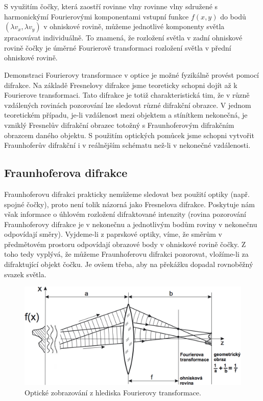 \documentclass[11pt,a4paper]{article}
\begin{document}
S využitím čočky, která zaostří rovinne vlny rovinne vlny sdružené s harmonickýmí Fourierovými komponentami
vstupní funkce $f(x,y)$ do bodů $(\lambda v_x, \lambda v_y)$ v ohniskové rovině, můžeme jednotlivé
komponenty světla zpracovávat individuálně. To znamená, že rozložení světla v zadní ohniskové 
rovině čočky je úměrné Fourierově transformaci rozložení světla v přední ohniskové rovině.

Demonstraci Fourierovy transformace v optice je možné fyzikálně provést pomocí difrakce. Na základě
Fresnelovy difrakce jsme teoreticky schopni dojít až k Fourierove transformaci. Tato difrakce je totiž
charakteristická tim, že v různě vzdálených rovinách pozorování lze sledovat různé difrakční obrazce. V jednom
teoretickém případu, je-li vzdálenost mezi objektem a stínítkem nekonečná, je vzniklý Fresnelův difrakční 
obrazec totožný s Fraunhoferovým difrakčním obrazcem daného objektu. S použitím optických pomůcek
jsme schopni vytvořit Fraunhoferův difrakční i v reálnějším schématu než-li v nekonečné vzdálenosti.

\subsection{Fraunhoferova difrakce}
Fraunhoferovu difrakci prakticky nemůžeme sledovat bez použití optiky (např. spojné čočky), proto není tolik
názorná jako Fresnelova difrakce. Poskytuje nám však informace o úhlovém rozložení difraktované intenzity 
(rovina pozorování Fraunhoferovy difrakce je v nekonečnu a jednotlivým bodům roviny v nekonečnu odpovídají směry). 
Vyjdeme-li z paprskové optiky, víme, že směrům v předmětovém prostoru odpovídají obrazové 
body v ohniskové rovině čočky. Z toho tedy vyplývá, že můžeme Fraunhoferovu difrakci pozorovat, 
vložíme-li za difraktující objekt čočku. Je ovšem třeba, aby na překážku dopadal rovnoběžný svazek světla.

\begin{figure}[H]
\centering
\includegraphics[width=14cm]{images/ft-cocka.png}
\caption{Optické zobrazování z hlediska Fourierovy transformace.}
\label{Fraunhofer}
\end{figure}
\end{document}
